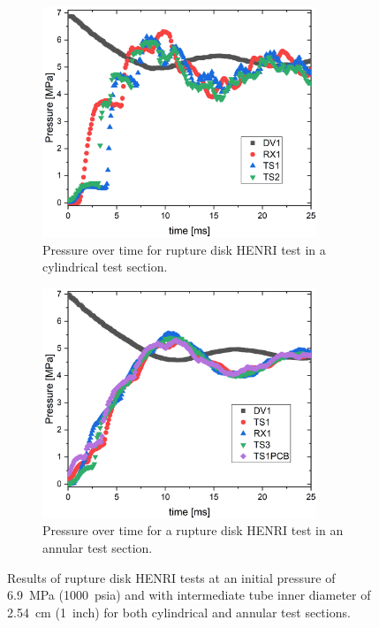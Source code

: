 \begin{figure}[tb]
    \vspace{16pt}
    \centering
    \begin{subfigure}[t]{0.45\textwidth}
        \centering
        \includegraphics[width=0.9\textwidth]{results/plots/BurstDiskTest_1inch.png}
        \caption{Pressure over time for rupture disk HENRI test in a cylindrical test section.}
        \label{fig:cyl disk}
    \end{subfigure}
    \hfill
    \begin{subfigure}[t]{0.45\textwidth}
        \centering
        \includegraphics[width=0.9\textwidth]{results/plots/1000psi_annular_disk.png}
        \caption{Pressure over time for a rupture disk HENRI test in an annular test section.}
        \label{fig:ann disk}
    \end{subfigure}
    
    \caption{Results of rupture disk HENRI tests at an initial pressure of \SI{6.9}{\mega\pascal} (\SI{1000}{psia}) and with intermediate tube inner diameter of \SI{2.54}{\centi\meter} (\SI{1}{inch}) for both cylindrical and annular test sections.}
    \label{fig:disk}
    \vspace{16pt}
\end{figure}


